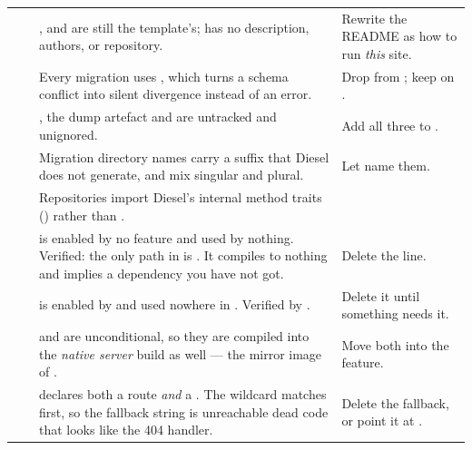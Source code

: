 \begin{longtable}{@{}p{}p{}L{0.375\textwidth}L{0.40\textwidth}@{}}
 &  & ,  and  are still the
 template's;  has no description, authors, or
repository. & Rewrite the README as how to run \emph{this} site. \\

 &  & Every migration uses , which turns a
schema conflict into silent divergence instead of an error. & Drop  from
; keep  on . \\

 &  & , the  dump artefact and
 are untracked and unignored. & Add all three to . \\

 &  & Migration directory names carry a  suffix that Diesel does
not generate, and mix singular and plural. & Let  name them. \\

 &  & Repositories import Diesel's internal method traits
() rather than . &
 \\

 &  &  is enabled by no
feature and used by nothing. Verified: the only  path in  is
. It compiles to nothing and implies a dependency you have not got. &
Delete the line. \\

 &  &  is enabled by  and used nowhere in
. Verified by . & Delete it until something needs it. \\

 &  &  and  are
unconditional, so they are compiled into the \emph{native server} build as well --- the mirror image
of . & Move both into the  feature. \\

 &  &  declares both a  route \emph{and} a
. The wildcard matches first, so the fallback string  is
unreachable dead code that looks like the 404 handler. & Delete the fallback, or point it at
. \\

\end{longtable}
\endgroup

